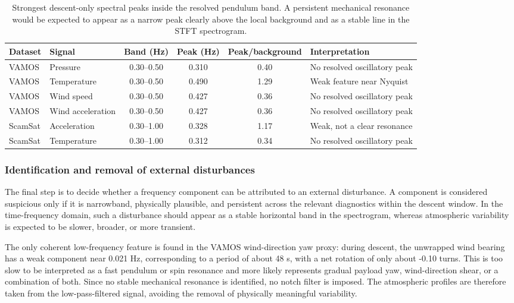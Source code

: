 \begin{table}[htbp]
    \centering
    \small
    \begin{tabularx}{\linewidth}{llcccX}
        \toprule
        Dataset & Signal & Band (Hz) & Peak (Hz) & Peak/background & Interpretation \\
        \midrule
        VAMOS & Pressure & 0.30--0.50 & 0.310 & 0.40 & No resolved oscillatory peak \\
        VAMOS & Temperature & 0.30--0.50 & 0.490 & 1.29 & Weak feature near Nyquist \\
        VAMOS & Wind speed & 0.30--0.50 & 0.427 & 0.36 & No resolved oscillatory peak \\
        VAMOS & Wind acceleration & 0.30--0.50 & 0.427 & 0.36 & No resolved oscillatory peak \\
        ScamSat & Acceleration & 0.30--1.00 & 0.328 & 1.17 & Weak, not a clear resonance \\
        ScamSat & Temperature & 0.30--1.00 & 0.312 & 0.34 & No resolved oscillatory peak \\
        \bottomrule
    \end{tabularx}
    \caption{Strongest descent-only spectral peaks inside the resolved pendulum band. A persistent mechanical resonance would be expected to appear as a narrow peak clearly above the local background and as a stable line in the STFT spectrogram.}
    \label{tab:spectral_descent_peaks}
\end{table}

\subsubsection{Identification and removal of external disturbances}
The final step is to decide whether a frequency component can be attributed to an external disturbance. A component is considered suspicious only if it is narrowband, physically plausible, and persistent across the relevant diagnostics within the descent window. In the time-frequency domain, such a disturbance should appear as a stable horizontal band in the spectrogram, whereas atmospheric variability is expected to be slower, broader, or more transient.

The only coherent low-frequency feature is found in the VAMOS wind-direction yaw proxy: during descent, the unwrapped wind bearing has a weak component near 0.021 Hz, corresponding to a period of about 48 s, with a net rotation of only about -0.10 turns. This is too slow to be interpreted as a fast pendulum or spin resonance and more likely represents gradual payload yaw, wind-direction shear, or a combination of both. Since no stable mechanical resonance is identified, no notch filter is imposed. The atmospheric profiles are therefore taken from the low-pass-filtered signal, avoiding the removal of physically meaningful variability.


